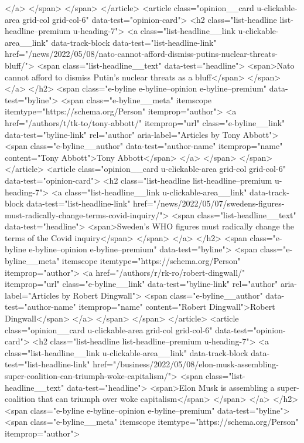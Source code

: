 {{{</a>
</span>
</span>
</article>
<article class="opinion__card u-clickable-area  grid-col grid-col-6" data-test="opinion-card">
<h2 class="list-headline list-headline--premium u-heading-7">
<a class="list-headline__link u-clickable-area__link" data-track-block data-test="list-headline-link" href="/news/2022/05/08/nato-cannot-afford-dismiss-putins-nuclear-threats-bluff/">
<span class="list-headline__text" data-test="headline">
<span>Nato cannot afford to dismiss Putin’s nuclear threats as a bluff</span>
</span>
</a>
</h2>
<span class="e-byline e-byline--opinion e-byline--premium" data-test="byline">
<span class="e-byline__meta" itemscope itemtype="https://schema.org/Person" itemprop="author">
<a href="/authors/t/tk-to/tony-abbott/" itemprop="url" class="e-byline__link" data-test="byline-link" rel="author" aria-label="Articles by Tony Abbott">
<span class="e-byline__author" data-test="author-name" itemprop="name" content="Tony Abbott">Tony Abbott</span>
</a>
</span>
</span>
</article>
<article class="opinion__card u-clickable-area  grid-col grid-col-6" data-test="opinion-card">
<h2 class="list-headline list-headline--premium u-heading-7">
<a class="list-headline__link u-clickable-area__link" data-track-block data-test="list-headline-link" href="/news/2022/05/07/swedens-figures-must-radically-change-terms-covid-inquiry/">
<span class="list-headline__text" data-test="headline">
<span>Sweden’s WHO figures must radically change the terms of the Covid inquiry</span>
</span>
</a>
</h2>
<span class="e-byline e-byline--opinion e-byline--premium" data-test="byline">
<span class="e-byline__meta" itemscope itemtype="https://schema.org/Person" itemprop="author">
<a href="/authors/r/rk-ro/robert-dingwall/" itemprop="url" class="e-byline__link" data-test="byline-link" rel="author" aria-label="Articles by Robert Dingwall">
<span class="e-byline__author" data-test="author-name" itemprop="name" content="Robert Dingwall">Robert Dingwall</span>
</a>
</span>
</span>
</article>
<article class="opinion__card u-clickable-area  grid-col grid-col-6" data-test="opinion-card">
<h2 class="list-headline list-headline--premium u-heading-7">
<a class="list-headline__link u-clickable-area__link" data-track-block data-test="list-headline-link" href="/business/2022/05/08/elon-musk-assembling-super-coalition-can-triumph-woke-capitalism/">
<span class="list-headline__text" data-test="headline">
<span>Elon Musk is assembling a super-coalition that can triumph over woke capitalism</span>
</span>
</a>
</h2>
<span class="e-byline e-byline--opinion e-byline--premium" data-test="byline">
<span class="e-byline__meta" itemscope itemtype="https://schema.org/Person" itemprop="author">
}}}
